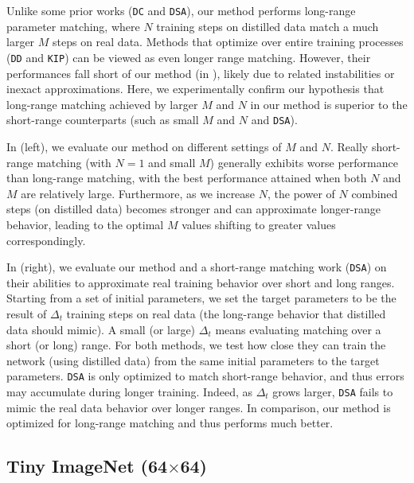 \documentclass[main.tex]{subfiles}
\begin{document}
Unlike some prior works (\texttt{DC} and \texttt{DSA}), our method performs long-range parameter matching, where $N$ training steps on distilled data match a much larger $M$ steps on real data. Methods that optimize over entire training processes (\eg \texttt{DD} and \texttt{KIP}) can be viewed as even longer range matching. However, their performances fall short of our method (\eg in ), likely due to related instabilities or inexact approximations. Here, we experimentally confirm our hypothesis that long-range matching achieved by larger $M$ and $N$ in our method is superior to the short-range counterparts (such as small $M$ and $N$ and \texttt{DSA}).


In  (left), we evaluate our method on different settings of $M$ and $N$. Really short-range matching (with $N=1$ and small $M$) generally exhibits worse performance than long-range matching, with the best performance attained when both $N$ and $M$ are relatively large. Furthermore, as we increase $N$, the power of  $N$ combined steps (on distilled data) becomes stronger and can approximate longer-range behavior, leading to the optimal $M$ values shifting to greater values correspondingly.



In   (right), we evaluate our method and a short-range matching work (\texttt{DSA}) on their abilities to approximate real training behavior over short and long ranges. Starting from a set of initial parameters, we set the target parameters to be the result of $\Delta_t$ training steps on real data (\ie the long-range behavior that distilled data should mimic). A small (or large) $\Delta_t$ means evaluating matching over a short (or long) range. For both methods, we test how close they can train the network (using distilled data) from the same initial parameters to the target parameters. \texttt{DSA} is only optimized to match short-range behavior, and thus errors may accumulate during longer training. Indeed, as $\Delta_t$ grows larger, \texttt{DSA} fails to mimic the real data behavior over longer ranges. In comparison, our method is optimized for long-range matching and thus performs much better.








\subsection{Tiny ImageNet (64$\times$64)}
\end{document}
